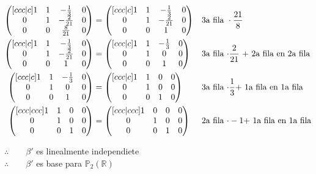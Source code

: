 \documentclass[letterpaper]{article}
\newcommand{\Po}{\mathds{P}_2(\mathds{R})}
\renewcommand{\*}{\cdot}
\theoremstyle{definition}
\begin{document}
\begin{align*}
\begin{pmatrix}[ccc|c]
1 & 1 & -\frac{1}{3} & 0\\
0 & 1 & -\frac{2}{21} & 0\\
0 & 0 & \frac{8}{21} & 0
\end{pmatrix}  & = \begin{pmatrix}[ccc|c]
1 & 1 & -\frac{1}{3} & 0\\
0 & 1 & -\frac{2}{21} & 0\\
0 & 0 & 1 & 0
\end{pmatrix}  && \text{3a fila } \* \frac{21}{8}\\
\begin{pmatrix}[ccc|c]
1 & 1 & -\frac{1}{3} & 0\\
0 & 1 & -\frac{2}{21} & 0\\
0 & 0 & 1 & 0
\end{pmatrix} &= \begin{pmatrix}[ccc|c]
1 & 1 & -\frac{1}{3} & 0\\
0 & 1 & 0 & 0\\
0 & 0 & 1 & 0
\end{pmatrix} && \text{3a fila $ \* \frac{2}{21} $ + 2a fila en 2a fila}\\
\begin{pmatrix}[ccc|c]
1 & 1 & -\frac{1}{3} & 0\\
0 & 1 & 0 & 0\\
0 & 0 & 1 & 0
\end{pmatrix}  &= \begin{pmatrix}[ccc|c]
1 & 1 & 0 & 0 \\
0 & 1 & 0 & 0\\
0 & 0 & 1 & 0
\end{pmatrix}  && \text{3a fila $ \* \frac{1}{3} + $ 1a fila en 1a fila } \\
\begin{pmatrix}[ccc|ccc]
1 & 1 & 0 & 0\\
0 & 1 & 0 & 0\\
0 & 0 & 1 & 0
\end{pmatrix} &= \begin{pmatrix}[ccc|ccc]
1 & 0 & 0 & 0 \\
0 & 1 & 0 & 0\\
0 & 0 & 1 & 0
\end{pmatrix} && \text{2a fila $ \* -1 + $ 1a fila en 1a fila}
\end{align*}
\begin{center}
	$ \therefore \qquad \beta' $ es linealmente independiete\\
	$ \therefore \qquad \beta' $ es base para $ \Po $
\end{center}
\end{document}
